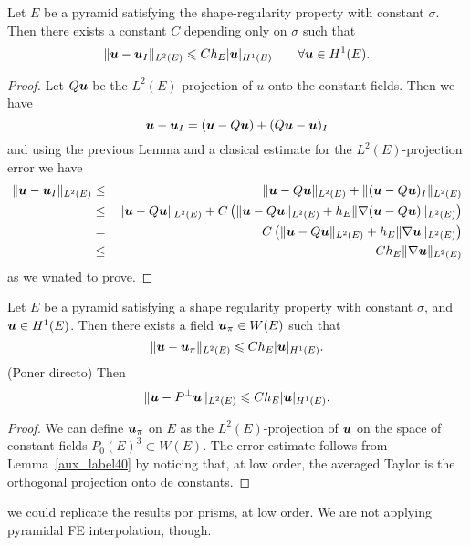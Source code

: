 \begin{proposition}\label{propErrorInterpolacionPiramidesTetraedros}
Let $E$ be a pyramid satisfying the shape-regularity property with constant $\sigma$.
Then there exists a constant $C$ depending only on $\sigma$ such that 
\[
\|\boldsymbol{u}-\boldsymbol{u}_I\|_{L^2(E)}\leqslant C h_E|\boldsymbol{u}|_{H^1(E)} \qquad \forall \boldsymbol{u}\in H^1(E).
\]
\end{proposition}
\begin{proof} Let $Q\boldsymbol{u}$ be the $L^2(E)$-projection of $u$ onto the constant fields. Then we have
\[
\boldsymbol{u}-\boldsymbol{u}_I = (\boldsymbol{u} - Q\boldsymbol{u}) + (Q\boldsymbol{u}-\boldsymbol{u})_I
\]
and using the previous Lemma and a clasical estimate for the $L^2(E)$-projection error we have
\begin{eqnarray*}
\|\boldsymbol{u}-\boldsymbol{u}_I\|_{L^2(E)} &\le& \|\boldsymbol{u} - Q\boldsymbol{u}\|_{L^2(E)} + \|(\boldsymbol{u}-Q\boldsymbol{u})_I\|_{L^2(E)}\\ &\le& \|\boldsymbol{u} - Q\boldsymbol{u}\|_{L^2(E)} + C \left(\|\boldsymbol{u}-Q\boldsymbol{u}\|_{L^2(E)} + h_E\|\nabla(\boldsymbol{u}-Q\boldsymbol{u})\|_{L^2(E)}\right)\\ &=& C\left(\|\boldsymbol{u}-Q\boldsymbol{u}\|_{L^2(E)} + h_E\|\nabla\boldsymbol{u}\|_{L^2(E)}\right)\\&\le& Ch_E\|\nabla\boldsymbol{u}\|_{L^2(E)}
\end{eqnarray*}
as we wnated to prove.
\end{proof}


\begin{proposition}\label{propupi}
Let $E$ be a pyramid satisfying a shape regularity property with constant $\sigma$, and $\boldsymbol{u}\in H^1(E)$. 
Then there exists a field $\boldsymbol{u}_\pi\in W(E)$ such that
\[
\|\boldsymbol{u}-\boldsymbol{u}_\pi\|_{L^2(E)}\leqslant C h_E|\boldsymbol{u}|_{H^1(E)}.
\]
(Poner directo) Then
\[
\|\boldsymbol{u}-P^{\perp}\boldsymbol{u}\|_{L^2(E)}\leqslant C h_E|\boldsymbol{u}|_{H^1(E)}.
\]
\end{proposition}
\begin{proof}
We can define $\boldsymbol{u}_\pi$ on $E$ as the $L^2(E)$-projection of $\boldsymbol{u}$ on the space
of constant fields $P_0(E)^3\subset W(E)$. The error estimate follows from 
Lemma~\ref{aux_label40}	
by noticing that, at low order, the averaged Taylor is the orthogonal projection
onto de constants.
\end{proof}
\begin{remark}
  we could replicate the results por prisms, at low order. We are not
  applying pyramidal FE interpolation, though.
\end{remark}